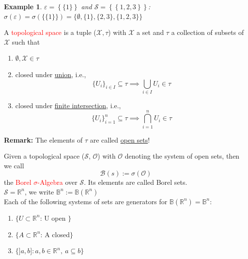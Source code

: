 \documentclass[10pt,a4paper]{article}
\theoremstyle{definition}
\theoremstyle{plain}
\newtheorem{example}{Example}[definition]
\begin{document}
\begin{example}
$\varepsilon = \left\{ \{1\} \right\}$ and $\mathcal{S} = \left\{ \left\{1, 2, 3\right\} \right\}$:\\
$\sigma(\varepsilon) = \sigma(\big\{ \{1\} \big\}) = \big\{\emptyset, \{1\}, \{2, 3\}, \{1, 2, 3\} \big\} $
\end{example}

\begin{boxeddef}
A \textcolor{red}{topological space} is a tuple ($\mathcal{X}, \tau$) with $\mathcal{X}$ a set and $\tau$ a collection of subsets of $\mathcal{X}$ such that
	\begin{enumerate}
		\item $\emptyset, \mathcal{X} \in \tau$
		\item closed under \underline{union}, i.e.,\\
		 $$ \big\{ U_i \big\}_{i \in I} \subseteq \tau \implies \bigcup_{i \in I} U_i \in \tau$$
		\item closed under \underline{finite intersection}, i.e., \\
			$$\big\{ U_i \big\}_{i = 1}^n \subseteq \tau \implies \bigcap_{i = 1}^{n} U_i \in \tau$$
	\end{enumerate}
\textbf{Remark:} The elements of $\tau$ are called \underline{open sets}!
\end{boxeddef}

\begin{boxeddef}
	Given a topological space ($\mathcal{S}$, $\mathcal{O}$) with $\mathcal{O}$ denoting the system of open sets, then we call
	$$\mathcal{B}(s) := \sigma(\mathcal{O})$$
	the \textcolor{red}{Borel $\sigma$-Algebra} over $\mathcal{S}$. Its elements are called Borel sets.\\
	\newline
	$ \mathcal{S} = \mathbb{R}^n$, we write $\mathbb{B}^n := \mathbb{B}(\mathbb{R}^n)$\\
	
	Each of the following systems of sets are generators for $\mathbb{B}(\mathbb{R}^n) = \mathbb{B}^n$:
	\begin{enumerate}
		\item $\{U \subset \mathbb{R}^n$: U open $\}$
		\item $\{A \subset \mathbb{R}^n$: A closed$\}$
		\item $\big\{ ]a,b ] : a, b\in \mathbb{R}^n,\ a\subseteq b \big\} $
	\end{enumerate}
\end{boxeddef}
\end{document}
